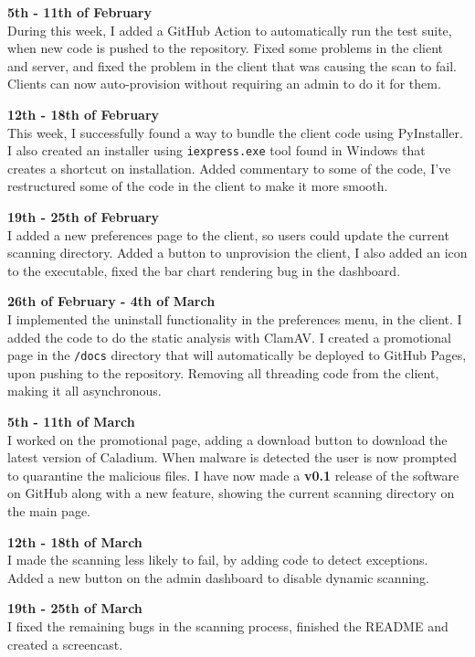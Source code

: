 \textbf{5th - 11th of February} \\
During this week, I added a GitHub Action to automatically run the test suite,
when new code is pushed to the repository.
Fixed some problems in the client and server,
and fixed the problem in the client that was causing the scan to fail.
Clients can now auto-provision without requiring an admin to do it for them.

\textbf{12th - 18th of February} \\
This week, I successfully found a way to bundle the client code using PyInstaller.
I also created an installer using \texttt{iexpress.exe} tool found in Windows
that creates a shortcut on installation.
Added commentary to some of the code,
I've restructured some of the code in the client to make it more smooth.

\textbf{19th - 25th of February} \\
I added a new preferences page to the client,
so users could update the current scanning directory.
Added a button to unprovision the client, I also added an icon to the executable,
fixed the bar chart rendering bug in the dashboard.

\textbf{26th of February - 4th of March} \\
I implemented the uninstall functionality in the preferences menu, in the client.
I added the code to do the static analysis with ClamAV.
I created a promotional page in the \texttt{/docs} directory
that will automatically be deployed to GitHub Pages, upon pushing to the repository.
Removing all threading code from the client, making it all asynchronous.

\textbf{5th - 11th of March} \\
I worked on the promotional page, adding a download button to
download the latest version of Caladium.
When malware is detected the user is now
prompted to quarantine the malicious files.
I have now made a \textbf{v0.1} release of the software on GitHub
along with a new feature, showing the current scanning directory on the main page.

\textbf{12th - 18th of March} \\
I made the scanning less likely to fail, by adding code to detect exceptions.
Added a new button on the admin dashboard to disable dynamic scanning.

\textbf{19th - 25th of March} \\
I fixed the remaining bugs in the scanning process,
finished the README and created a screencast.

